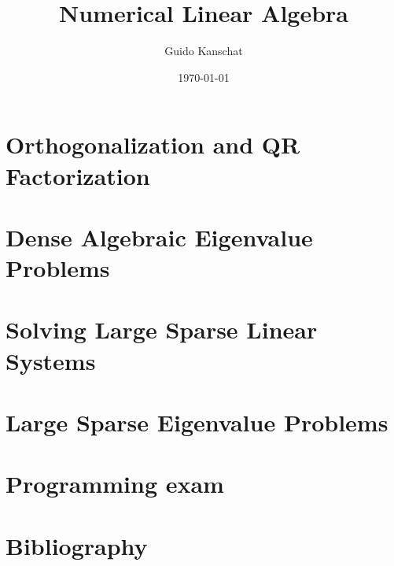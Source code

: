 \documentclass[notheorems,hidelinks,aspectratio=1610]{beamer}
\title{Numerical Linear Algebra}
\author{Guido Kanschat}
\date{\today}
\begin{document}
\frame{\maketitle}

\section{Orthogonalization and QR Factorization}
\frame{\sectoc}


\section{Dense Algebraic Eigenvalue Problems}
\frame{\sectoc}





\section{Solving Large Sparse Linear Systems}
\frame{\sectoc}








\section{Large Sparse Eigenvalue Problems}
\frame{\sectoc}





\section{Programming exam}
\frame{\sectoc}



\section*{Bibliography}
\frame{
}

\end{document}
